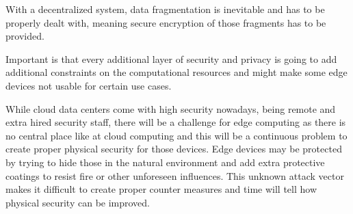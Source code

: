 With a decentralized system, data fragmentation is inevitable and has to be properly dealt with, meaning secure encryption of those fragments has to be provided.

Important is that every additional layer of security and privacy is going to add additional constraints on the computational resources and might make some edge devices not usable for certain use cases.

While cloud data centers come with high security nowadays, being remote and extra hired security staff, there will be a challenge for edge computing as there is no central place like at cloud computing and this will be a continuous problem to create proper physical security for those devices. 
Edge devices may be protected by trying to hide those in the natural environment and add extra protective coatings to resist fire or other unforeseen influences. This unknown attack vector makes it difficult to create proper counter measures and time will tell how physical security can be improved.

